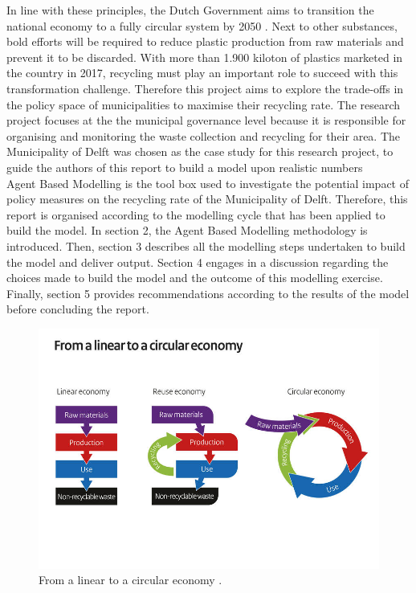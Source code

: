 \noindent In line with these principles, the Dutch Government aims to transition the national economy to a fully circular system by 2050 \cite{GovernmentoftheNetherlands2021}. Next to other substances, bold efforts will be required to reduce plastic production from raw materials and prevent it to be discarded. With more than 1.900 kiloton of plastics marketed in the country in 2017, recycling must play an important role to succeed with this transformation challenge. Therefore this project aims to explore the trade-offs in the policy space of municipalities to maximise their recycling rate. The research project focuses at the the municipal governance level because it is responsible for organising and monitoring the waste collection and recycling for their area. The Municipality of Delft was chosen as the case study for this research project, to guide the authors of this report to build a model upon realistic numbers\\

\noindent Agent Based Modelling is the tool box used to investigate the potential impact of policy measures on the recycling rate of the Municipality of Delft. Therefore, this report is organised according to the modelling cycle that has been applied to build the model. In section 2, the Agent Based Modelling methodology is introduced. Then, section 3 describes all the modelling steps undertaken to build the model and deliver output. Section 4 engages in a discussion regarding the choices made to build the model and the outcome of this modelling exercise. Finally, section 5 provides recommendations according to the results of the model before concluding the report.

\begin{figure}[H]
    \centering
        \captionsetup{width=\linewidth}
        \includegraphics[width=0.7\linewidth]{Images/from-linear-to-a-circulair-economy.jpg}
        \caption{From a linear to a circular economy \cite{GovernmentoftheNetherlands2021}.}
    \label{fig:From a linear to a circular economy.}
\end{figure}
